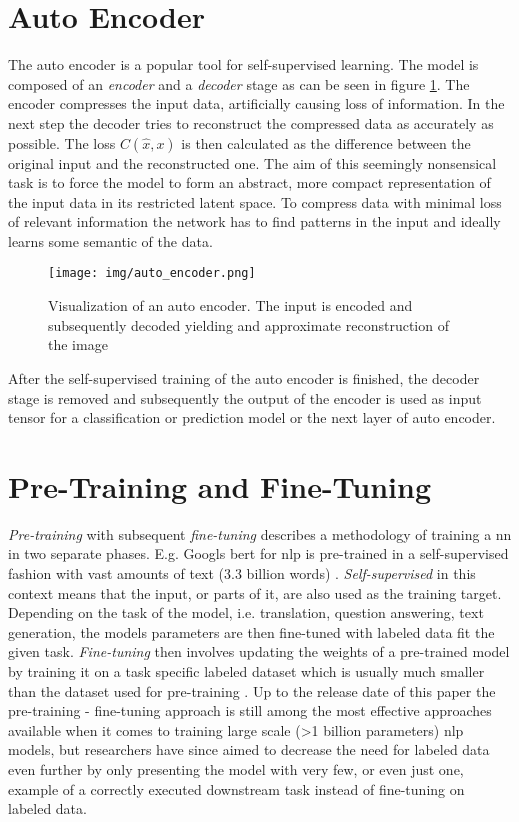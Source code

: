 \section{Auto Encoder} \label{sec:backgrund:autoencoder}

The auto encoder is a popular tool for self-supervised learning. The model is composed of an \textit{encoder} and a \textit{decoder} stage as can be seen in figure \ref{fig:auto_encoder}. The encoder compresses the input data, artificially causing loss of information. In the next step the decoder tries to reconstruct the compressed data as accurately as possible. The loss $C(\hat{x},x)$ is then calculated as the difference between the original input and the reconstructed one. The aim of this seemingly nonsensical task is to force the model to form an abstract, more compact representation of 
the input data in its restricted latent space. To compress data with minimal loss of relevant information the network has to find patterns in the input and ideally learns some semantic of the data. 

\begin{figure}[h]
	\centering
	\texttt{[image: img/auto\_encoder.png]}
	\caption{Visualization of an auto encoder. The input is encoded and subsequently decoded yielding and approximate reconstruction of the image \cite{auto_encoders}}
	\label{fig:auto_encoder}
\end{figure}

After the self-supervised training of the auto encoder is finished, the decoder stage is removed and subsequently the output of the encoder is used as input tensor for a classification or prediction model or the next layer of auto encoder. 

\section{Pre-Training and Fine-Tuning}

\textit{Pre-training} with subsequent \textit{fine-tuning} describes a methodology of training a \gls{nn} in two separate phases. E.g. Googls \gls{bert} for \gls{nlp} is pre-trained in a self-supervised fashion with vast amounts of text (3.3 billion words) \cite{bert}. \textit{Self-supervised} in this context means that the input, or parts of it, are also used as the training target. Depending on the task of the model, i.e. translation, question answering, text generation, the models parameters are then fine-tuned with labeled data fit the given task. \textit{Fine-tuning} then involves updating the weights of a pre-trained model by training it on a task specific labeled dataset which is usually much smaller than the dataset used for pre-training \cite{gpt3}. Up to the release date of this paper the pre-training - fine-tuning approach is still among the most effective approaches available when it comes to training large scale (>1 billion parameters) \gls{nlp} models, but researchers have since aimed to decrease the need for labeled data even further by only presenting the model with very few, or even just one, example of a correctly executed downstream task \cite{gpt3} instead of fine-tuning on labeled data.

